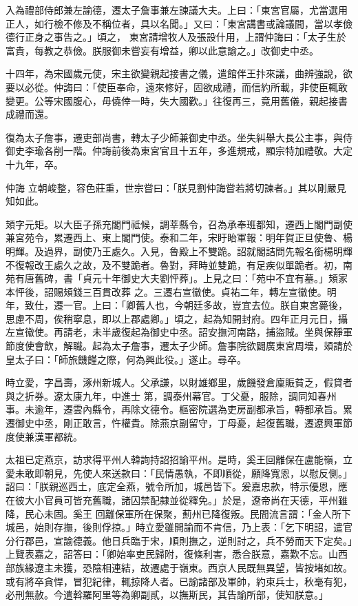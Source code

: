 \begin{pinyinscope}
 入為禮部侍郎兼左諭德，遷太子詹事兼左諫議大夫。上曰：「東宮官屬，尤當選用正人，如行檢不修及不稱位者，具以名聞。」又曰：「東宮講書或論議間，當以孝儉德行正身之事告之。」頃之，
 東宮請增牧人及張設什用，上謂仲誨曰：「太子生於富貴，每教之恭儉。朕服御未嘗妄有增益，卿以此意諭之。」改御史中丞。



 十四年，為宋國歲元使，宋主欲變親起接書之儀，遣館伴王抃來議，曲辨強說，欲要以必從。仲誨曰：「使臣奉命，遠來修好，固欲成禮，而信約所載，非使臣輒敢變更。公等宋國腹心，毋僥倖一時，失大國歡。」往復再三，竟用舊儀，親起接書成禮而還。



 復為太子詹事，遷吏部尚書，轉太子少師兼御史中丞。坐失糾舉大長公主事，與侍御史李瑜各削一階。仲誨前後為東宮官且十五年，多進規戒，顯宗特加禮敬。大定十九年，卒。



 仲誨
 立朝峻整，容色莊重，世宗嘗曰：「朕見劉仲誨嘗若將切諫者。」其以剛嚴見知如此。



 頍字元矩。以大臣子孫充閣門祗候，調莘縣令，召為承奉班都知，遷西上閣門副使兼宮苑令，累遷西上、東上閣門使。泰和二年，宋盱眙軍報：明年賀正旦使魯、楊明輝。及過界，副使乃王處久。入見，魯殿上不雙跪。詔就閣詰問先報名銜楊明輝不復報改王處久之故，及不雙跪者。魯對，拜時並雙跪，有足疾似單跪者。初，南苑有唐舊碑，書「貞元十年御史大夫劉怦葬」。上見之曰：「苑中不宜有墓。」頍家本怦後，詔賜頍錢三百貫改葬
 之。三遷右宣徽使。貞祐二年，轉左宣徽使。明年，致仕，遷一官。上曰：「卿舊人也，今朝廷多故，豈宜去位。朕自東宮薨後，思慮不周，俟稍寧息，即以上郡處卿。」頃之，起為知開封府。四年正月元日，攝左宣徽使。再請老，未半歲復起為御史中丞。詔安撫河南路，捕盜賊。坐與保靜軍節度使會飲，解職。起為太子詹事，遷太子少師。詹事院欲闢廣東宮周墻，頍請於皇太子曰：「師旅饑饉之際，何為興此役。」遂止。尋卒。



 時立愛，字昌壽，涿州新城人。父承謙，以財雄鄉里，歲饑發倉廩賑貧乏，假貸者與之折券。遼太康九年，中進士
 第，調泰州幕官。丁父憂，服除，調同知春州事。未逾年，遷雲內縣令，再除文德令。樞密院選為吏房副都承旨，轉都承旨。累遷御史中丞，剛正敢言，忤權貴。除燕京副留守，丁母憂，起復舊職，遷遼興軍節度使兼漢軍都統。



 太祖已定燕京，訪求得平州人韓詢持詔招諭平州。是時，奚王回離保在盧能嶺，立愛未敢即朝見，先使人來送款曰：「民情愚執，不即順從，願降寬恩，以慰反側。」詔曰：「朕親巡西土，底定全燕，號令所加，城邑皆下。爰嘉忠款，特示優恩，應在彼大小官員可皆充舊職，諸囚禁配隸並從釋免。」於是，遼帝尚在天德，平州雖降，民心未固。奚王
 回離保軍所在保聚，薊州已降復叛。民間流言謂：「金人所下城邑，始則存撫，後則俘掠。」時立愛雖開諭而不肯信，乃上表：「乞下明詔，遣官分行郡邑，宣諭德義。他日兵臨于宋，順則撫之，逆則討之，兵不勞而天下定矣。」上覽表嘉之，詔答曰：「卿始率吏民歸附，復條利害，悉合朕意，嘉歎不忘。山西部族緣遼主未獲，恐陰相連結，故遷處于嶺東。西京人民既無異望，皆按堵如故。或有將卒貪悍，冒犯紀律，輒掠降人者。已諭諸部及軍帥，約束兵士，秋毫有犯，必刑無赦。今遣斡羅阿里等為卿副貳，以撫斯民，其告諭所部，使知朕意。」




\end{pinyinscope}
